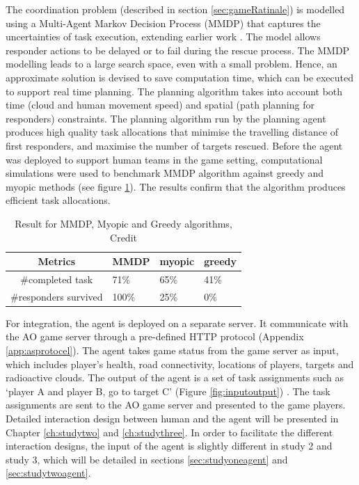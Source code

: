 The coordination problem (described in section \ref{sec:gameRatinale}) is modelled using a Multi-Agent Markov Decision Process (MMDP) that captures the uncertainties of task execution, extending earlier work \cite{Wu2015}. The model allows responder actions to be delayed or to fail during the rescue process. The MMDP modelling leads to a large search space, even with a small problem. Hence,  an approximate solution is devised to save computation time, which can be executed to support real time planning. The planning algorithm takes into account both time (cloud and human movement speed) and spatial (path planning for responders) constraints. The planning algorithm run by the planning agent produces high quality task allocations that minimise the travelling distance of first responders, and maximise the number of targets rescued. Before the agent was deployed to support human teams in the game setting, computational simulations were used to benchmark MMDP algorithm against greedy and myopic methods (see figure \ref{tab:agentBenchmarking}). The results confirm that the algorithm produces efficient task allocations.\\


\begin{table}[h]
\centering
\begin{tabular}{c|lll}
Metrics               & MMDP  & myopic & greedy \\ \hline
\#completed task      & 71\%  & 65\%   & 41\%   \\
\#responders survived & 100\% & 25\%   & 0\%   
\end{tabular}
\caption{Result for MMDP, Myopic and Greedy algorithms, Credit \cite{Ramchurn2015a}}
\label{tab:agentBenchmarking}
\end{table}

For integration, the agent is deployed on a separate server. It communicate with the \ac{AO} game server through a pre-defined HTTP protocol (Appendix \ref{app:asprotocel}). The agent takes game status from the game server as input, which includes player's health, road connectivity, locations of players, targets and radioactive clouds. The output of the agent is a set of task assignments such as `player A and player B, go to target C' (Figure \ref{fig:inputoutput}) . The task assignments are sent to the \ac{AO} game server and presented to the game players. Detailed interaction design between human and the agent will be presented in Chapter \ref{ch:studytwo} and \ref{ch:studythree}. In order to facilitate the different interaction designs, the input of the agent is slightly different in study 2 and study 3, which will be detailed in sections \ref{sec:studyoneagent} and \ref{sec:studytwoagent}. \\

